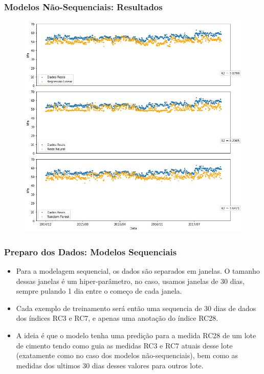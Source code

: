 \documentclass{beamer}
\begin{document}
\begin{frame}
\frametitle{Modelos Não-Sequenciais: Resultados}  
\begin{figure}[H]
\centering
\includegraphics[scale=0.3]{exped_saco_2008-2012-2014RC28.png}
\end{figure}
\end{frame}


\begin{frame}
  \frametitle{Preparo dos Dados: Modelos Sequenciais}
  \begin{itemize}
  \item Para a modelagem sequencial, os dados são separados em janelas. O tamanho
    dessas janelas é um hiper-parâmetro, no caso, usamos janelas de 30 dias,
    sempre pulando 1 dia entre o começo de cada janela.
    
  \item Cada exemplo de treinamento será então uma sequencia de 30 dias de dados dos
    índices RC3 e RC7, e apenas uma anotação do índice RC28.
  \item A ideia é que o modelo tenha uma predição para a medida RC28  de um lote de cimento
    tendo como guia as medidas RC3 e RC7 atuais desse lote (exatamente como no
    caso dos modelos não-sequenciais), bem como as medidas
    dos ultimos 30 dias desses valores para outros lote.
  \end{itemize}
\end{frame}
\end{document}
